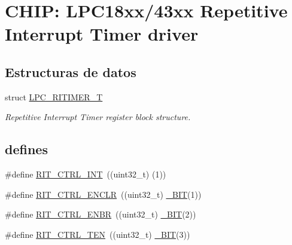 \hypertarget{group___r_i_t_i_m_e_r__18_x_x__43_x_x}{}\section{C\+H\+IP\+: L\+P\+C18xx/43xx Repetitive Interrupt Timer driver}
\label{group___r_i_t_i_m_e_r__18_x_x__43_x_x}
\subsection*{Estructuras de datos}
\begin{DoxyCompactItemize}
\item 
struct \hyperlink{struct_l_p_c___r_i_t_i_m_e_r___t}{L\+P\+C\+\_\+\+R\+I\+T\+I\+M\+E\+R\+\_\+T}
\begin{DoxyCompactList}\small\item\em Repetitive Interrupt Timer register block structure. \end{DoxyCompactList}\end{DoxyCompactItemize}
\subsection*{\textquotesingle{}defines\textquotesingle{}}
\begin{DoxyCompactItemize}
\item 
\#define \hyperlink{group___r_i_t_i_m_e_r__18_x_x__43_x_x_ga35abb740dd6c6be63ef5ee80db909f48}{R\+I\+T\+\_\+\+C\+T\+R\+L\+\_\+\+I\+NT}~((uint32\+\_\+t) (1))
\item 
\#define \hyperlink{group___r_i_t_i_m_e_r__18_x_x__43_x_x_ga16cdab6f304738d645d704ae2d161412}{R\+I\+T\+\_\+\+C\+T\+R\+L\+\_\+\+E\+N\+C\+LR}~((uint32\+\_\+t) \hyperlink{group___l_p_c___types___public___macros_ga7ee022f5e5a971a8324e4b7572d49170}{\+\_\+\+B\+IT}(1))
\item 
\#define \hyperlink{group___r_i_t_i_m_e_r__18_x_x__43_x_x_ga5b766561bf28441b64bc533325e43be0}{R\+I\+T\+\_\+\+C\+T\+R\+L\+\_\+\+E\+N\+BR}~((uint32\+\_\+t) \hyperlink{group___l_p_c___types___public___macros_ga7ee022f5e5a971a8324e4b7572d49170}{\+\_\+\+B\+IT}(2))
\item 
\#define \hyperlink{group___r_i_t_i_m_e_r__18_x_x__43_x_x_gae2134d5c74919d6016d09b7d410b7b3d}{R\+I\+T\+\_\+\+C\+T\+R\+L\+\_\+\+T\+EN}~((uint32\+\_\+t) \hyperlink{group___l_p_c___types___public___macros_ga7ee022f5e5a971a8324e4b7572d49170}{\+\_\+\+B\+IT}(3))
\end{DoxyCompactItemize}
